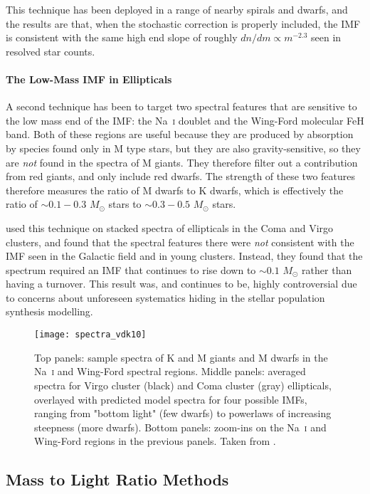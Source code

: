 This technique has been deployed in a range of nearby spirals and dwarfs, and the results are that, when the stochastic correction is properly included, the IMF is consistent with the same high end slope of roughly $dn/dm\propto m^{-2.3}$ seen in resolved star counts.

\paragraph{The Low-Mass IMF in Ellipticals} A second technique has been to target two spectral features that are sensitive to the low mass end of the IMF: the Na~\textsc{i} doublet and the Wing-Ford molecular FeH band. Both of these regions are useful because they are produced by absorption by species found only in M type stars, but they are also gravity-sensitive, so they are \textit{not} found in the spectra of M giants. They therefore filter out a contribution from red giants, and only include red dwarfs. The strength of these two features therefore measures the ratio of M dwarfs to K dwarfs, which is effectively the ratio of $\sim 0.1-0.3$ $M_\odot$ stars to $\sim 0.3-0.5$ $M_\odot$ stars.

\citet{van-dokkum10a} used this technique on stacked spectra of ellipticals in the Coma and Virgo clusters, and found that the spectral features there were \textit{not} consistent with the IMF seen in the Galactic field and in young clusters. Instead, they found that the spectrum required an IMF that continues to rise down to $\sim 0.1$ $M_\odot$ rather than having a turnover. This result was, and continues to be, highly controversial due to concerns about unforeseen systematics hiding in the stellar population synthesis modelling.

\begin{figure}
\texttt{[image: spectra\_vdk10]}
\caption[Elliptical galaxy spectra in the Na~\textsc{i} and Wing-Ford regions]{
\label{fig:spectra_vdk10}
Top panels: sample spectra of K and M giants and M dwarfs in the Na~\textsc{i} and Wing-Ford spectral regions. Middle panels: averaged spectra for Virgo cluster (black) and Coma cluster (gray) ellipticals, overlayed with predicted model spectra for four possible IMFs, ranging from "bottom light" (few dwarfs) to powerlaws of increasing steepness (more dwarfs). Bottom panels: zoom-ins on the Na~\textsc{i} and Wing-Ford regions in the previous panels. Taken from \citet{van-dokkum10a}.
}
\end{figure}

\subsection{Mass to Light Ratio Methods}

